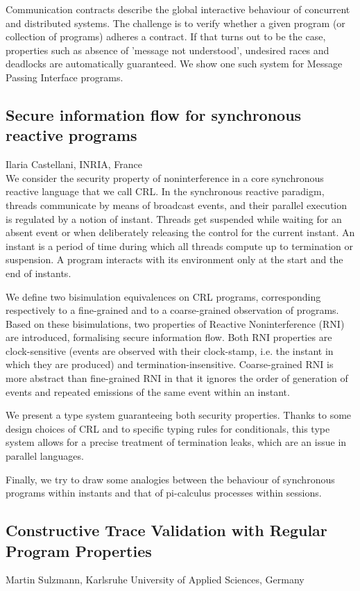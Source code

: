 \documentclass[11pt]{article}
\begin{document}
Communication contracts describe the global interactive behaviour of
concurrent and distributed systems. The challenge is to verify whether
a given program (or collection of programs) adheres a contract. If
that turns out to be the case, properties such as absence of 'message
not understood', undesired races and deadlocks are automatically
guaranteed. We show one such system for Message Passing Interface
programs.

\subsection*{Secure information flow for synchronous reactive programs}
\noindent Ilaria Castellani, INRIA, France \\[0.5ex]

We consider the security property of noninterference in a core
synchronous reactive language that we call CRL. In the synchronous
reactive paradigm, threads communicate by means of broadcast events,
and their parallel execution is regulated by a notion of
instant. Threads get suspended while waiting for an absent event or
when deliberately releasing the control for the current instant. An
instant is a period of time during which all threads compute up to
termination or suspension. A program interacts with its environment
only at the start and the end of instants.
 
We define two bisimulation equivalences on CRL programs, corresponding
respectively to a fine-grained and to a coarse-grained observation of
programs. Based on these bisimulations, two properties of Reactive
Noninterference (RNI) are introduced, formalising secure information
flow. Both RNI properties are clock-sensitive (events are observed
with their clock-stamp, i.e. the instant in which they are produced)
and termination-insensitive. Coarse-grained RNI is more abstract than
fine-grained RNI in that it ignores the order of generation of events
and repeated emissions of the same event within an instant.
 
We present a type system guaranteeing both security properties. Thanks
to some design choices of CRL and to specific typing rules for
conditionals, this type system allows for a precise treatment of
termination leaks, which are an issue in parallel languages.
 
Finally, we try to draw some analogies between the behaviour of
synchronous programs within instants and that of pi-calculus processes
within sessions.

\subsection*{Constructive Trace Validation with Regular Program Properties}
\noindent Martin Sulzmann, Karlsruhe University of Applied Sciences, Germany
\\[0.5ex]
\end{document}
